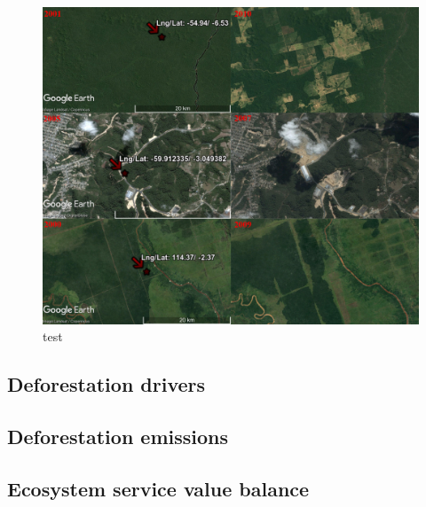 \begin{figure}
	\centering
	\includegraphics[scale=0.7]{img/deforestation_examples}
	\caption[list titel]{test}
	\label{fig:test}
\end{figure}

\subsection{Deforestation drivers}
\subsection{Deforestation emissions}
\subsection{Ecosystem service value balance}
